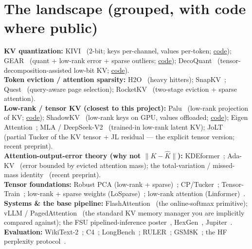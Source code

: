 \documentclass[11pt]{article}
\begin{document}
\section{The landscape (grouped, with code where public)}

\textbf{KV quantization:} KIVI~\cite{kivi} (2-bit; keys per-channel, values per-token;
\href{https://github.com/jy-yuan/KIVI}{code}); GEAR~\cite{gear} (quant + low-rank error + sparse
outliers; \href{https://github.com/opengear-project/GEAR}{code}); DecoQuant~\cite{decoquant}
(tensor-decomposition-assisted low-bit KV; \href{https://github.com/lpyhdzx/DecoQuant_code}{code}).
\\[2pt]
\textbf{Token eviction / attention sparsity:} H2O~\cite{h2o} (heavy hitters); SnapKV~\cite{snapkv};
Quest~\cite{quest} (query-aware page selection); RocketKV~\cite{rocketkv} (two-stage
eviction + sparse attention).
\\[2pt]
\textbf{Low-rank / tensor KV (closest to this project):} Palu~\cite{palu} (low-rank projection of
KV; \href{https://github.com/shadowpa0327/Palu}{code}); ShadowKV~\cite{shadowkv} (low-rank keys on
GPU, values offloaded; \href{https://github.com/ByteDance-Seed/ShadowKV}{code}); Eigen
Attention~\cite{eigenattn}; MLA / DeepSeek-V2~\cite{mla} (trained-in low-rank latent KV);
JoLT~\cite{jolt} (partial Tucker of the KV tensor + JL residual --- the explicit tensor version;
recent preprint).
\\[2pt]
\textbf{Attention-output-error theory (why not $\lVert K-\hat K\rVert$):} KDEformer~\cite{kdeformer};
Ada-KV~\cite{adakv} (error bounded by evicted attention mass); the total-variation / missed-mass
identity~\cite{tvattn} (recent preprint).
\\[2pt]
\textbf{Tensor foundations:} Robust PCA (low-rank + sparse)~\cite{rpca}; CP/Tucker~\cite{kolda};
Tensor-Train~\cite{tt}; low-rank + sparse weights (LoSparse)~\cite{losparse}; low-rank attention
(Linformer)~\cite{linformer}.
\\[2pt]
\textbf{Systems \& the base pipeline:} FlashAttention~\cite{flashattention} (the online-softmax
primitive); vLLM / PagedAttention~\cite{pagedattention} (the standard KV memory manager you are
implicitly compared against); the FSU pipelined-inference poster~\cite{poster}, HexGen~\cite{hexgen},
Jupiter~\cite{jupiter}.
\\[2pt]
\textbf{Evaluation:} WikiText-2~\cite{wikitext}; C4~\cite{c4}; LongBench~\cite{longbench};
RULER~\cite{ruler}; GSM8K~\cite{gsm8k}; the HF perplexity protocol~\cite{hfppl}.
\end{document}
